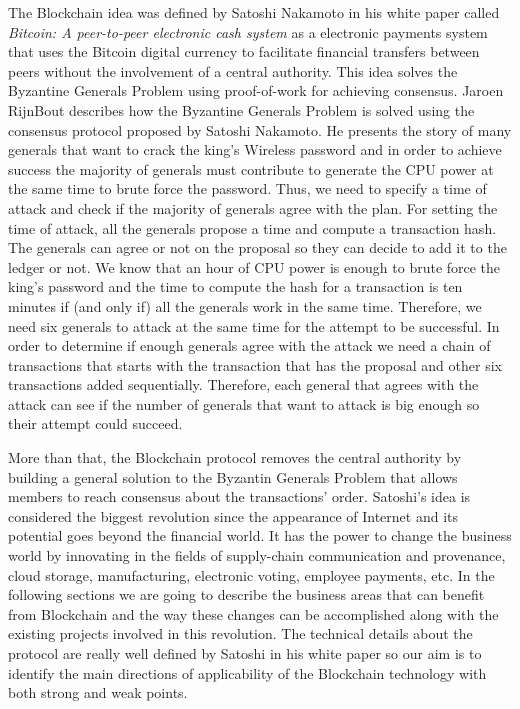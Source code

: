 The Blockchain idea was defined by Satoshi Nakamoto in his white paper called \emph{Bitcoin: A peer-to-peer electronic cash  system} \cite{bitcoinwhitepaper} as a electronic payments system that uses the Bitcoin digital currency to facilitate financial transfers between peers without the involvement of a central authority.
This idea solves the Byzantine Generals Problem using proof-of-work for achieving consensus. Jaroen RijnBout \cite{pow-byzantine} describes how the Byzantine Generals Problem is solved using the consensus protocol proposed by Satoshi Nakamoto. He presents the story of many generals that want to crack the king's Wireless password and in order to achieve success the majority of generals must contribute to generate the CPU power at the same time to brute force the password. Thus, we need to specify a time of attack and check if the majority of generals agree with the plan. For setting the time of attack, all the generals propose a time and compute a transaction hash. The generals can agree or not on the proposal so they can decide to add it to the ledger or not. We know that an hour of CPU power is enough to brute force the king's password and the time to compute the hash for a transaction is ten minutes if (and only if) all the generals work in the same time. Therefore, we need six generals to attack at the same time for the attempt to be successful. In order to determine if enough generals agree with the attack we need a chain of transactions that starts with the transaction that has the proposal and other six transactions added sequentially. Therefore, each general that agrees with the attack can see if the number of generals that want to attack is big enough so their attempt could succeed.

More than that, the Blockchain protocol removes the central authority by building a general solution to the Byzantin Generals Problem that allows members to reach consensus about the transactions' order.
Satoshi's idea is considered the biggest revolution since the appearance of Internet and its potential goes beyond the financial world. It has the power to change the business world by innovating in the fields of supply-chain communication and provenance, cloud storage, manufacturing, electronic voting, employee payments, etc.
In the following sections we are going to describe the business areas that can benefit from Blockchain and the way these changes can be accomplished along with the existing projects involved in this revolution.
The technical details about the protocol are really well defined by Satoshi in his white paper \cite{bitcoinwhitepaper} so our aim is to identify the main directions of applicability of the Blockchain technology with both strong and weak points. 

